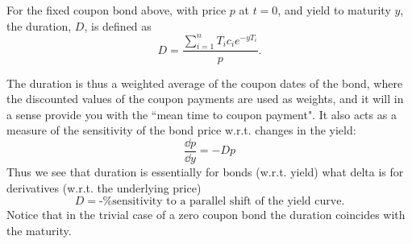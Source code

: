 \begin{definition}[Duration]
    For the fixed coupon bond above, with price $p$ at $t = 0$, and yield to maturity $y$, the duration, $D$, is defined as
    \begin{equation}
        D = \frac{\sum_{i=1}^n T_i c_i e^{-yT_i}}{p}.
    \end{equation}
\end{definition}
The duration is thus a weighted average of the coupon dates of the bond, where the discounted values of the coupon payments are used as weights, and it will in a sense provide you with the ``mean time to coupon payment". It also acts as a measure of the sensitivity of the bond price w.r.t. changes in the yield:
\begin{equation*}
    \frac{\dd p}{\dd y} = -Dp
\end{equation*}
Thus we see that duration is essentially for bonds (w.r.t. yield) what delta is for derivatives (w.r.t. the underlying price)
\begin{equation}
    D = \text{-\% sensitivity to a parallel shift of the yield curve.}
\end{equation}
Notice that in the trivial case of a zero coupon bond the duration coincides with the maturity.

